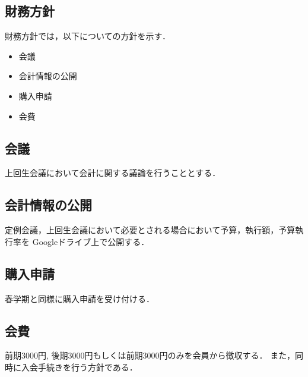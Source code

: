 \subsection*{財務方針}



財務方針では，以下についての方針を示す．
\begin{itemize}
  \item 会議
  \item 会計情報の公開
  \item 購入申請
  \item 会費
\end{itemize}

\subsection*{会議}
上回生会議において会計に関する議論を行うこととする．

\subsection*{会計情報の公開}
定例会議，上回生会議において必要とされる場合において予算，執行額，予算執行率を
Googleドライブ上で公開する．

\subsection*{購入申請}
春学期と同様に購入申請を受け付ける．

\subsection*{会費}
前期3000円, 後期3000円もしくは前期3000円のみを会員から徴収する．
また，同時に入会手続きを行う方針である．
